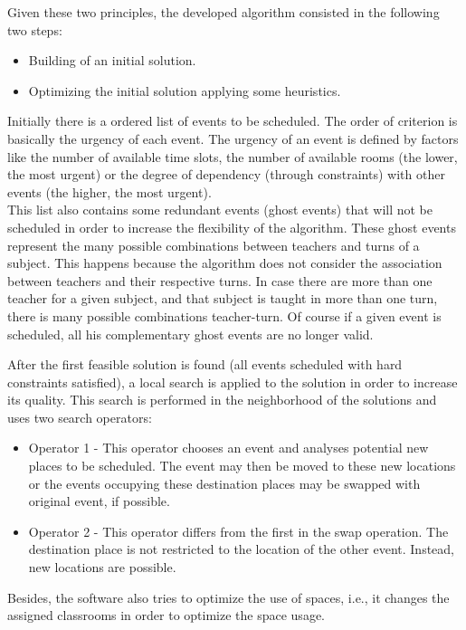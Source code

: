 Given these two principles, the developed algorithm consisted in the following two steps:
\begin{itemize}
	\item Building of an initial solution.
	\item Optimizing the initial solution applying some heuristics. 
\end{itemize}

Initially there is a ordered list of events to be scheduled. The order of criterion is basically the urgency of each event. The urgency of an event is defined by factors like the number of available time slots, the number of available rooms (the lower, the most urgent) or the degree of dependency (through constraints) with other events (the higher, the most urgent).\\ 
This list also contains some redundant events (ghost events) that will not be scheduled in order to increase the flexibility of the algorithm. These ghost events represent the many possible combinations between teachers and turns of a subject. This happens because the algorithm does not consider the association between teachers and their respective turns. In case there are more than one teacher for a given subject, and that subject is taught in more than one turn, there is many possible combinations teacher-turn. Of course if a given event is scheduled, all his complementary ghost events are no longer valid.

After the first feasible solution is found (all events scheduled with hard constraints satisfied), a local search is applied to the solution in order to increase its quality. This search is performed in the neighborhood of the solutions and uses two search operators:
\begin{itemize}
	\item Operator 1 - This operator chooses an event and analyses potential new places to be scheduled. The event may then be moved to these new locations or the events occupying these destination places may be swapped with original event, if possible.
	\item Operator 2 - This operator differs from the first in the swap operation. The destination place is not restricted to the location of the other event. Instead, new locations are possible. 
\end{itemize}

Besides, the software also tries to optimize the use of spaces, i.e., it changes the assigned classrooms in order to optimize the space usage.



